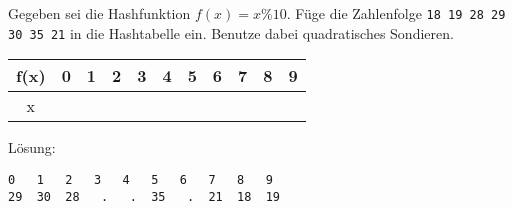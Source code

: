 
\renewcommand{\arraystretch}{2.0}
\setlength{\tabcolsep}{14pt}
\question[3]
Gegeben sei die Hashfunktion $f(x) = x \% 10$.
Füge die Zahlenfolge
\texttt{18 19 28 29 30 35 21}  in die Hashtabelle ein.
Benutze dabei quadratisches Sondieren.

\begin{tabular}{|c|c|c|c|c|c|c|c|c|c|c|}
\hline f(x) & 0 & 1 & 2 & 3 & 4 & 5 & 6 & 7 & 8 & 9 \\
\hline x     &   &    &    &   &   &    &    &   &   & \\
\hline
\end{tabular}

\ifprintanswers
Lösung:
\begin{lstlisting}
0   1   2   3   4   5   6   7   8   9
29  30  28   .   .  35   .  21  18  19
\end{lstlisting}
\fi
